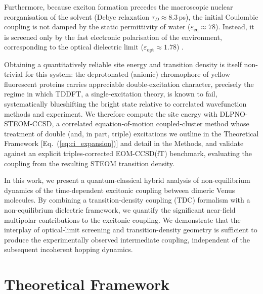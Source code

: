 \documentclass[journal=jpcbfk, manuscript=article, layout=twocolumn, doi=true]{achemso}
\begin{document}
Furthermore, because exciton formation precedes the macroscopic nuclear reorganisation of the solvent (Debye relaxation $\tau_D \approx 8.3$\,ps), the initial Coulombic coupling is not damped by the static permittivity of water ($\varepsilon_{\mathrm{eq}} \approx 78$). Instead, it is screened only by the fast electronic polarisation of the environment, corresponding to the optical dielectric limit ($\varepsilon_{\mathrm{opt}} \approx 1.78$) \cite{mennucci2012, scholes2003}.

Obtaining a quantitatively reliable site energy and transition density is itself non-trivial for this system: the deprotonated (anionic) chromophore of yellow fluorescent proteins carries appreciable double-excitation character, precisely the regime in which TDDFT, a single-excitation theory, is known to fail, systematically blueshifting the bright state relative to correlated wavefunction methods and experiment. We therefore compute the site energy with DLPNO-STEOM-CCSD, a correlated equation-of-motion coupled-cluster method whose treatment of double (and, in part, triple) excitations we outline in the Theoretical Framework [Eq.~(\ref{eq:ci_expansion})] and detail in the Methods, and validate against an explicit triples-corrected EOM-CCSD(fT) benchmark, evaluating the coupling from the resulting STEOM transition density.

In this work, we present a quantum-classical hybrid analysis of non-equilibrium dynamics of the time-dependent excitonic coupling between dimeric Venus molecules. By combining a transition-density coupling (TDC) formalism with a non-equilibrium dielectric framework, we quantify the significant near-field multipolar contributions to the excitonic coupling. We demonstrate that the interplay of optical-limit screening and transition-density geometry is sufficient to produce the experimentally observed intermediate coupling, independent of the subsequent incoherent hopping dynamics.
\section{Theoretical Framework}
\end{document}
